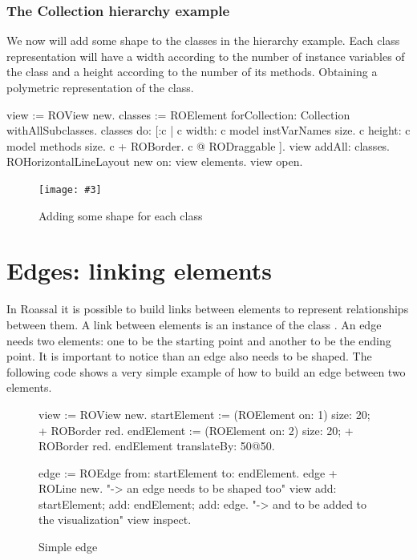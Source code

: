 \documentclass[a4paper,10pt,twoside]{book}
\newcommand{\fig}[4]{
		\begin{figure}[#1]
			\centering
			\texttt{[image: \#3]}
			\caption{\label{fig:#3}#4}
		\end{figure}}
\begin{document}
\subsubsection*{The Collection hierarchy example}
We now will add some shape to the classes in the  hierarchy example. Each class representation will have a width according to the number of instance variables of the class and a height according to the number of its methods. Obtaining a polymetric representation of the class.

\begin{code}{}
view := ROView new.
classes := ROElement forCollection: Collection withAllSubclasses.
classes do: [:c | 
	c width: c model instVarNames size.
	c height: c model methods size.
	c + ROBorder. 
	c @ RODraggable ].
view addAll: classes.
ROHorizontalLineLayout new on: view elements.
view open.
\end{code}

\fig{H}{0.6}{hier2}{Adding some shape for each class}


\section{Edges: linking elements} 

In Roassal it is possible to build links between elements to represent relationships between them. A link between elements is an instance of the class . An edge needs two elements: one to be the starting point and another to be the ending point. It is important to notice than an edge also needs to be shaped. The following code shows a very simple example of how to build an edge between two elements.

\begin{figure}[H]
 \begin{code}{}
view := ROView new.
startElement := (ROElement on: 1) size: 20; + ROBorder red.
endElement := (ROElement on: 2)  size: 20; + ROBorder red.
endElement translateBy: 50@50.

edge := ROEdge from: startElement to: endElement.
edge + ROLine new. "-> an edge needs to be shaped too"
view 
	add: startElement; 
	add: endElement; 
	add: edge. "-> and to be added to the visualization"
view inspect.
\end{code}   
\caption{Simple edge}
\label{fig:simpleEdge}
\end{figure} 
\end{document}
